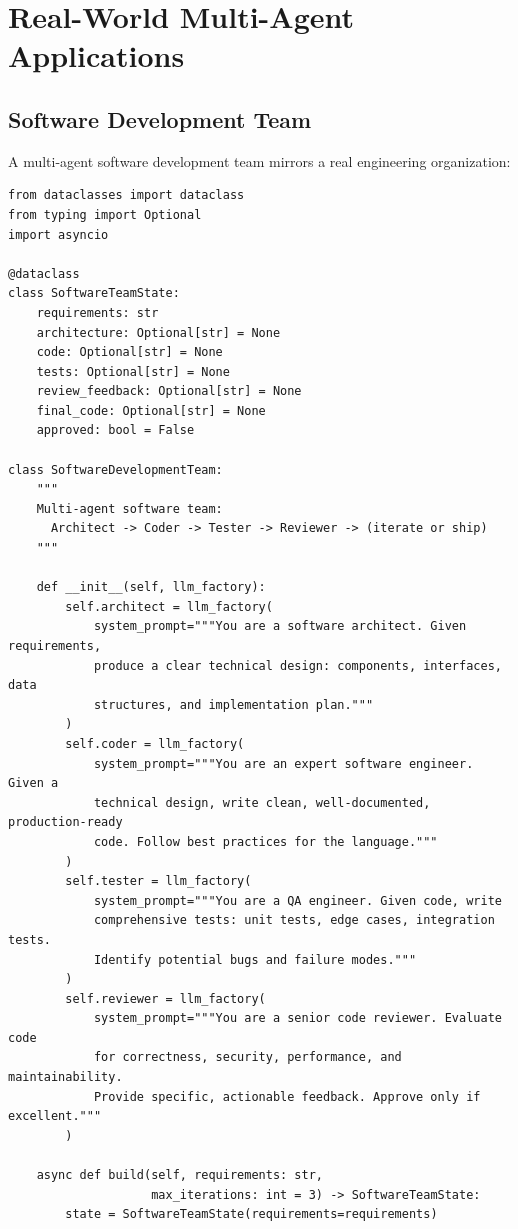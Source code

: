 \section{Real-World Multi-Agent Applications}
\label{subsec:mas-applications}

\subsection{Software Development Team}
\label{software-development-team}

A multi-agent software development team mirrors a real engineering organization:

\begin{lstlisting}[style=pythonstyle]
from dataclasses import dataclass
from typing import Optional
import asyncio

@dataclass
class SoftwareTeamState:
    requirements: str
    architecture: Optional[str] = None
    code: Optional[str] = None
    tests: Optional[str] = None
    review_feedback: Optional[str] = None
    final_code: Optional[str] = None
    approved: bool = False

class SoftwareDevelopmentTeam:
    """
    Multi-agent software team:
      Architect -> Coder -> Tester -> Reviewer -> (iterate or ship)
    """

    def __init__(self, llm_factory):
        self.architect = llm_factory(
            system_prompt="""You are a software architect. Given requirements,
            produce a clear technical design: components, interfaces, data
            structures, and implementation plan."""
        )
        self.coder = llm_factory(
            system_prompt="""You are an expert software engineer. Given a
            technical design, write clean, well-documented, production-ready
            code. Follow best practices for the language."""
        )
        self.tester = llm_factory(
            system_prompt="""You are a QA engineer. Given code, write
            comprehensive tests: unit tests, edge cases, integration tests.
            Identify potential bugs and failure modes."""
        )
        self.reviewer = llm_factory(
            system_prompt="""You are a senior code reviewer. Evaluate code
            for correctness, security, performance, and maintainability.
            Provide specific, actionable feedback. Approve only if excellent."""
        )

    async def build(self, requirements: str,
                    max_iterations: int = 3) -> SoftwareTeamState:
        state = SoftwareTeamState(requirements=requirements)


\end{lstlisting}
